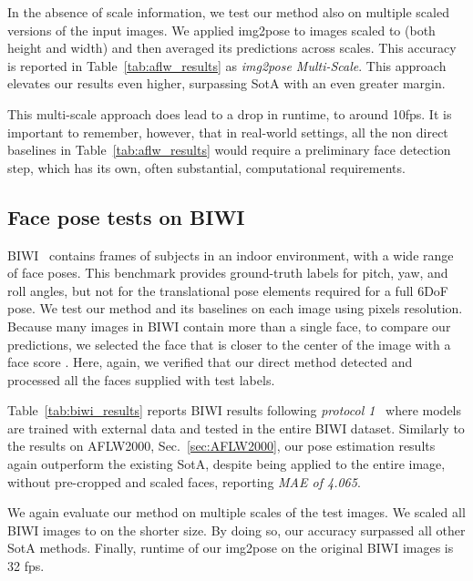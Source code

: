 \documentclass[final]{cvpr}
\newcommand{\minisection}[1]{\vspace{1mm}\noindent{\textbf{#1}.}}
\begin{document}
In the absence of scale information, we test our method also on multiple scaled versions of the input images. We applied img2pose to images scaled to  (both height and width) and then averaged its predictions across scales. This accuracy is reported in Table~\ref{tab:aflw_results} as {\em img2pose Multi-Scale}. This approach elevates our results even higher, surpassing SotA with an even greater margin.    

This multi-scale approach does lead to a drop in runtime, to around 10fps. It is important to remember, however, that in real-world settings, all the non direct baselines in Table~\ref{tab:aflw_results} would require a preliminary face detection step, which has its own, often substantial, computational requirements. 




\subsection{Face pose tests on BIWI}\label{sec:BIWI}
BIWI~\cite{biwi} contains  frames of  subjects in an indoor environment, with a wide range of face poses. This benchmark provides ground-truth labels for pitch, yaw, and roll angles, but not for the translational pose elements required for a full 6DoF pose. We test our method and its baselines on each image using  pixels resolution. Because many images in BIWI contain more than a single face, to compare our predictions, we selected the face that is closer to the center of the image with a face score . Here, again, we verified that our direct method detected and processed all the faces supplied with test labels. 

\minisection{BIWI face pose results} Table~\ref{tab:biwi_results} reports BIWI results following {\em protocol 1}~\cite{hopenet, fsanet} where models are trained with external data and tested in the entire BIWI dataset. Similarly to the results on AFLW2000, Sec.~\ref{sec:AFLW2000}, our pose estimation results again outperform the existing SotA, despite being applied to the entire image, without pre-cropped and scaled faces, reporting {\em MAE of 4.065}.

We again evaluate our method on multiple scales of the test images. We scaled all BIWI images to  on the shorter size. By doing so, our accuracy surpassed all other SotA methods. Finally, runtime of our img2pose on the original  BIWI images is 32 fps.  


\begin{figure*}[!ht]
\end{figure*}
\end{document}
